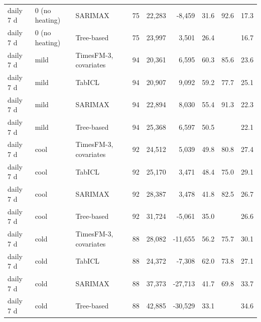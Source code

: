 \begin{tabular}{lllrrrrrr}
daily 7 d & 0 (no heating) & SARIMAX & 75 & 22,283 & -8,459 & 31.6 & 92.6 & 17.3 \\
daily 7 d & 0 (no heating) & Tree-based & 75 & 23,997 & 3,501 & 26.4 &  & 16.7 \\
daily 7 d & mild & TimesFM-3, covariates & 94 & 20,361 & 6,595 & 60.3 & 85.6 & 23.6 \\
daily 7 d & mild & TabICL & 94 & 20,907 & 9,092 & 59.2 & 77.7 & 25.1 \\
daily 7 d & mild & SARIMAX & 94 & 22,894 & 8,030 & 55.4 & 91.3 & 22.3 \\
daily 7 d & mild & Tree-based & 94 & 25,368 & 6,597 & 50.5 &  & 22.1 \\
daily 7 d & cool & TimesFM-3, covariates & 92 & 24,512 & 5,039 & 49.8 & 80.8 & 27.4 \\
daily 7 d & cool & TabICL & 92 & 25,170 & 3,471 & 48.4 & 75.0 & 29.1 \\
daily 7 d & cool & SARIMAX & 92 & 28,387 & 3,478 & 41.8 & 82.5 & 26.7 \\
daily 7 d & cool & Tree-based & 92 & 31,724 & -5,061 & 35.0 &  & 26.6 \\
daily 7 d & cold & TimesFM-3, covariates & 88 & 28,082 & -11,655 & 56.2 & 75.7 & 30.1 \\
daily 7 d & cold & TabICL & 88 & 24,372 & -7,308 & 62.0 & 73.8 & 27.1 \\
daily 7 d & cold & SARIMAX & 88 & 37,373 & -27,713 & 41.7 & 69.8 & 33.7 \\
daily 7 d & cold & Tree-based & 88 & 42,885 & -30,529 & 33.1 &  & 34.6 \\
\bottomrule
\end{tabular}
